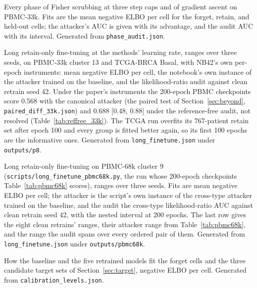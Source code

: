 \documentclass{article}
\begin{document}
\begin{table}[h]
\centering
\caption{Every phase of Fisher scrubbing at three step caps and of gradient ascent on PBMC-33k. Fits are the mean negative ELBO per cell for the forget, retain, and held-out cells; the attacker's AUC is given with its advantage, and the audit AUC with its interval. Generated from \texttt{phase\_audit.json}.}
\label{tab:phase_full}
\small
\resizebox{\textwidth}{!}{}
\end{table}

\begin{table}[h]
\centering
\caption{Long retain-only fine-tuning at the methods' learning rate, ranges over three seeds, on PBMC-33k cluster 13 and TCGA-BRCA Basal, with NB42's own per-epoch instruments: mean negative ELBO per cell, the notebook's own instance of the attacker trained on the baseline, and the likelihood-ratio audit against clean retrain seed 42. Under the paper's instruments the 200-epoch PBMC checkpoints score 0.568 with the canonical attacker (the paired test of Section~\ref{sec:beyond}, \texttt{paired\_diff\_33k.json}) and 0.688 [0.48, 0.88] under the reference-free audit, not resolved (Table~\ref{tab:reffree_33k}). The TCGA run overfits its 767-patient retain set after epoch 100 and every group is fitted better again, so its first 100 epochs are the informative ones. Generated from \texttt{long\_finetune.json} under \texttt{outputs/p8}.}
\label{tab:longft}
\small
\resizebox{\textwidth}{!}{}
\end{table}

\begin{table}[h]
\centering
\caption{Long retain-only fine-tuning on PBMC-68k cluster 9 (\texttt{scripts/long\_finetune\_pbmc68k.py}, the run whose 200-epoch checkpoints Table~\ref{tab:pbmc68k} scores), ranges over three seeds. Fits are mean negative ELBO per cell; the attacker is the script's own instance of the cross-type attacker trained on the baseline, and the audit the cross-type likelihood-ratio AUC against clean retrain seed 42, with the nested interval at 200 epochs. The last row gives the eight clean retrains' ranges, their attacker range from Table~\ref{tab:pbmc68k}, and the range the audit spans over every ordered pair of them. Generated from \texttt{long\_finetune.json} under \texttt{outputs/pbmc68k}.}
\label{tab:longft68k}
\small
\resizebox{\textwidth}{!}{}
\end{table}

\begin{table}[h]
\centering
\caption{How the baseline and the five retrained models fit the forget cells and the three candidate target sets of Section~\ref{sec:target}, negative ELBO per cell. Generated from \texttt{calibration\_levels.json}.}
\label{tab:levels}
\small
\resizebox{\textwidth}{!}{}
\end{table}
\end{document}

